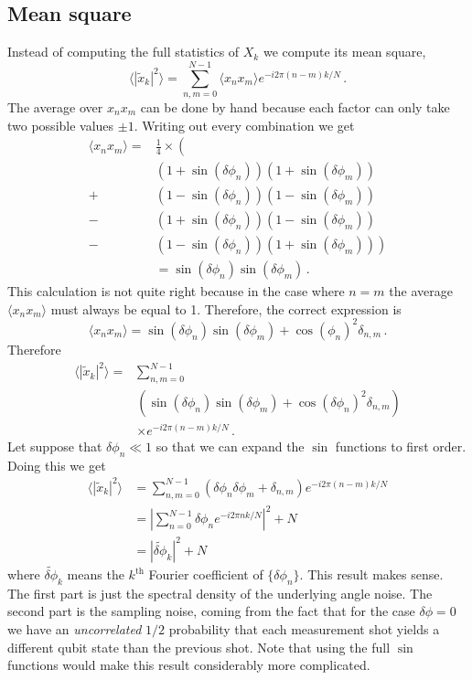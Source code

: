 \documentclass[twocolumn]{article}
\begin{document}
\subsection{Mean square}

Instead of computing the full statistics of $X_k$ we compute its mean square,
\begin{equation}
\langle | \tilde{x}_k |^2 \rangle = \sum_{n,m = 0}^{N-1} \langle x_n x_m \rangle e^{-i 2 \pi (n-m) k / N} \, .
\end{equation}
The average over $x_n x_m$ can be done by hand because each factor can only take two possible values $\pm 1$.
Writing out every combination we get
\begin{align}
\langle x_n x_m \rangle = &\frac{1}{4} \times \left( \right. \nonumber \\
  &(1 + \sin(\delta \phi_n))(1 + \sin(\delta \phi_m)) \nonumber \\
+ &(1 - \sin(\delta \phi_n))(1 - \sin(\delta \phi_m)) \nonumber \\
- &(1 + \sin(\delta \phi_n))(1 - \sin(\delta \phi_m)) \nonumber \\
- &(1 - \sin(\delta \phi_n))(1 + \sin(\delta \phi_m)) \left. \right) \nonumber \\
&= \sin(\delta \phi_n)\sin(\delta \phi_m) \, .
\end{align}
This calculation is not quite right because in the case where $n=m$ the average $\langle x_n x_m \rangle$ must always be equal to 1.
Therefore, the correct expression is
\begin{equation}
\langle x_n x_m \rangle = \sin(\delta \phi_n) \sin(\delta \phi_m) + \cos(\phi_n)^2 \delta_{n,m} \, .
\end{equation}
Therefore \begin{align}
\langle |\tilde{x}_k|^2 \rangle = & \sum_{n,m = 0}^{N-1} \nonumber \\
& \left( \sin(\delta \phi_n) \sin(\delta \phi_m) + \cos(\delta \phi_n)^2 \delta_{n,m} \right) \nonumber \\
& \times e^{-i 2 \pi (n-m) k / N} \, .
\end{align}
Let suppose that $\delta \phi_n \ll 1$ so that we can expand the $\sin$ functions to first order.
Doing this we get
\begin{align}
\langle |\tilde{x}_k|^2 \rangle
&= \sum_{n,m=0}^{N-1} \left( \delta \phi_n \delta \phi_m + \delta_{n,m} \right) e^{-i 2 \pi (n-m) k / N} \nonumber \\
&= \left| \sum_{n=0}^{N-1} \delta \phi_n e^{-i 2 \pi n k / N} \right|^2 + N \nonumber \\
&= \left| \tilde{\delta \phi}_k \right|^2 + N
\end{align}
where $\tilde{\delta \phi}_k$ means the $k^\text{th}$ Fourier coefficient of $\{ \delta \phi_n \}$.
This result makes sense.
The first part is just the spectral density of the underlying angle noise.
The second part is the sampling noise, coming from the fact that for the case $\delta \phi = 0$ we have an \emph{uncorrelated} $1/2$ probability that each measurement shot yields a different qubit state than the previous shot.
Note that using the full $\sin$ functions would make this result considerably more complicated.
\end{document}
